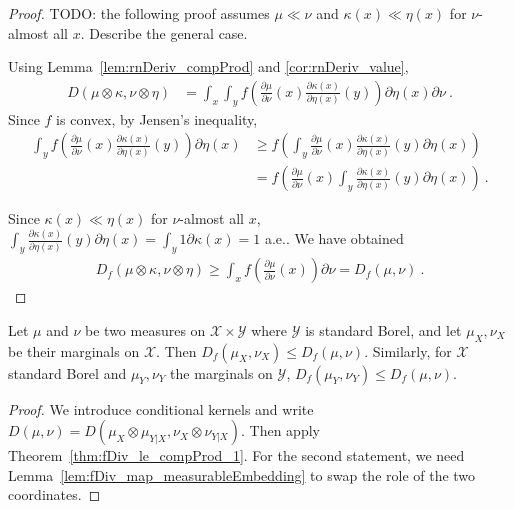 \begin{proof}\leanok
{}
TODO: the following proof assumes $\mu \ll \nu$ and $\kappa(x) \ll \eta(x)$ for $\nu$-almost all $x$. Describe the general case.

Using Lemma~\ref{lem:rnDeriv_compProd} and \ref{cor:rnDeriv_value},
\begin{align*}
D(\mu \otimes \kappa, \nu \otimes \eta)
&= \int_x \int_y f \left( \frac{\partial \mu}{\partial\nu}(x) \frac{\partial \kappa(x)}{\partial\eta(x)}(y) \right) \partial \eta(x) \partial \nu
\: .
\end{align*}
Since $f$ is convex, by Jensen's inequality,
\begin{align*}
\int_y f \left( \frac{\partial \mu}{\partial\nu}(x) \frac{\partial \kappa(x)}{\partial\eta(x)}(y) \right) \partial \eta(x)
&\ge f \left( \int_y \frac{\partial \mu}{\partial\nu}(x) \frac{\partial \kappa(x)}{\partial\eta(x)}(y) \partial \eta(x) \right)
\\
&= f \left( \frac{\partial \mu}{\partial\nu}(x) \int_y \frac{\partial \kappa(x)}{\partial\eta(x)}(y) \partial \eta(x) \right)
\: .
\end{align*}

Since $\kappa(x) \ll \eta(x)$ for $\nu$-almost all $x$, $\int_y \frac{\partial \kappa(x)}{\partial\eta(x)}(y) \partial \eta(x) = \int_y 1 \partial \kappa(x) = 1$ a.e.. We have obtained
\begin{align*}
D_f(\mu \otimes \kappa, \nu \otimes \eta)
\ge \int_x f \left( \frac{\partial \mu}{\partial\nu}(x)\right) \partial \nu
= D_f(\mu, \nu)
\: .
\end{align*}
\end{proof}

\begin{theorem}[Marginals]
  \label{thm:fDiv_fst_le_1}
  \leanok
  Let $\mu$ and $\nu$ be two measures on $\mathcal X \times \mathcal Y$ where $\mathcal Y$ is standard Borel, and let $\mu_X, \nu_X$ be their marginals on $\mathcal X$.
  Then $D_f(\mu_X, \nu_X) \le D_f(\mu, \nu)$.
  Similarly, for $\mathcal X$ standard Borel and $\mu_Y, \nu_Y$ the marginals on $\mathcal Y$, $D_f(\mu_Y, \nu_Y) \le D_f(\mu, \nu)$.
\end{theorem}

\begin{proof}\leanok
{}
We introduce conditional kernels and write $D(\mu, \nu) = D(\mu_X \otimes \mu_{Y|X}, \nu_X \otimes \nu_{Y|X})$. Then apply Theorem~\ref{thm:fDiv_le_compProd_1}.
For the second statement, we need Lemma~\ref{lem:fDiv_map_measurableEmbedding} to swap the role of the two coordinates.
\end{proof}

